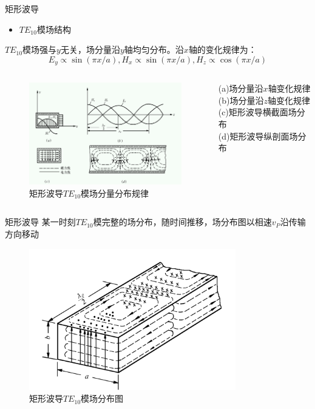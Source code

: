 \begin{frame}{矩形波导}
    \begin{itemize}
        \item $TE_{10}$模场结构
    \end{itemize}
    $TE_{10}$模场强与$y$无关，场分量沿$y$轴均匀分布。沿$x$轴的变化规律为：
    $$E_y \propto \sin(\pi x/a),H_x \propto \sin(\pi x/a),H_z \propto \cos(\pi x/a)$$
    \begin{columns}
        \begin{column}{0.7\linewidth}
            \begin{figure}
                \includegraphics[width=7cm]{Cha6//fig6-4.png}
                \caption{\footnotesize{矩形波导$TE_{10}$模场分量分布规律}}
            \end{figure}
        \end{column}
        \begin{column}{0.3\linewidth}
            {\footnotesize (a)场分量沿$x$轴变化规律\\
            (b)场分量沿$z$轴变化规律\\
            (c)矩形波导横截面场分布\\
            (d)矩形波导纵剖面场分布}
        \end{column}
    \end{columns}
\end{frame}

\begin{frame}{矩形波导}
    某一时刻$TE_{10}$模完整的场分布，随时间推移，场分布图以相速$v_P$沿传输方向移动
    \begin{figure}
        \includegraphics[width=9cm]{Cha6//fig6-5.png}
        \caption{\footnotesize{矩形波导$TE_{10}$模场分布图}}
    \end{figure}
\end{frame}

